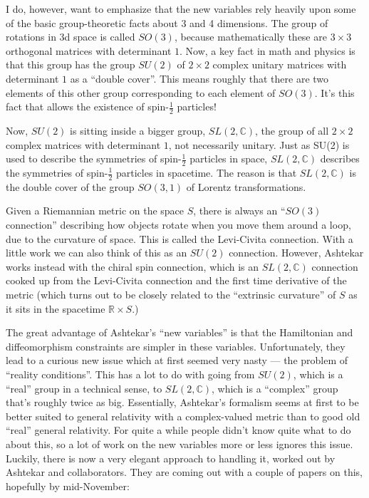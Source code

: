 \documentclass{article}
\begin{document}
I do, however, want to emphasize that the new variables rely heavily
upon some of the basic group-theoretic facts about 3 and 4 dimensions.
The group of rotations in 3d space is called \(SO(3)\), because
mathematically these are \(3\times3\) orthogonal matrices with
determinant \(1\). Now, a key fact in math and physics is that this
group has the group \(SU(2)\) of \(2\times2\) complex unitary matrices
with determinant \(1\) as a ``double cover''. This means roughly that
there are two elements of this other group corresponding to each element
of \(SO(3)\). It's this fact that allows the existence of
spin-\(\frac12\) particles!

Now, \(SU(2)\) is sitting inside a bigger group, \(SL(2,\mathbb{C})\),
the group of all \(2\times2\) complex matrices with determinant \(1\),
not necessarily unitary. Just as SU(2) is used to describe the
symmetries of spin-\(\frac12\) particles in space, \(SL(2,\mathbb{C})\)
describes the symmetries of spin-\(\frac12\) particles in spacetime. The
reason is that \(SL(2,\mathbb{C})\) is the double cover of the group
\(SO(3,1)\) of Lorentz transformations.

Given a Riemannian metric on the space \(S\), there is always an
``\(SO(3)\) connection'' describing how objects rotate when you move
them around a loop, due to the curvature of space. This is called the
Levi-Civita connection. With a little work we can also think of this as
an \(SU(2)\) connection. However, Ashtekar works instead with the chiral
spin connection, which is an \(SL(2,\mathbb{C})\) connection cooked up
from the Levi-Civita connection and the first time derivative of the
metric (which turns out to be closely related to the ``extrinsic
curvature'' of \(S\) as it sits in the spacetime
\(\mathbb{R} \times S\).)

The great advantage of Ashtekar's ``new variables'' is that the
Hamiltonian and diffeomorphism constraints are simpler in these
variables. Unfortunately, they lead to a curious new issue which at
first seemed very nasty --- the problem of ``reality conditions''. This
has a lot to do with going from \(SU(2)\), which is a ``real'' group in
a technical sense, to \(SL(2,\mathbb{C})\), which is a ``complex'' group
that's roughly twice as big. Essentially, Ashtekar's formalism seems at
first to be better suited to general relativity with a complex-valued
metric than to good old ``real'' general relativity. For quite a while
people didn't know quite what to do about this, so a lot of work on the
new variables more or less ignores this issue. Luckily, there is now a
very elegant approach to handling it, worked out by Ashtekar and
collaborators. They are coming out with a couple of papers on this,
hopefully by mid-November:
\end{document}
